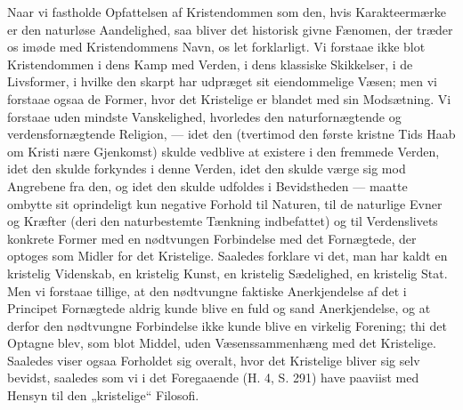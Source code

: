 \documentclass[12pt,a4paper,openany]{book}
\newcommand{\opage}[1]{\marginnote{\footnotesize\textit{[#1]}}}
\begin{document}
Naar vi fastholde Opfattelsen af Kristendommen som
den, hvis Karakteermærke er den naturløse Aandelighed, saa
bliver det historisk givne Fænomen, der træder os imøde
med Kristendommens Navn, os let forklarligt. Vi forstaae
ikke blot Kristendommen i dens Kamp med Verden, i dens
klassiske Skikkelser, i de Livsformer, i hvilke den skarpt har
udpræget sit eiendommelige Væsen; men vi forstaae ogsaa de
Former, hvor det Kristelige er blandet med sin Modsætning.
Vi forstaae uden mindste Vanskelighed, hvorledes den naturfornægtende
og verdensfornægtende Religion, --- idet den
(tvertimod den første kristne Tids Haab om Kristi nære
Gjenkomst) skulde vedblive at existere i den fremmede Verden,
idet den skulde forkyndes i denne Verden, idet den skulde
værge sig mod Angrebene fra den, og idet den skulde udfoldes
i Bevidstheden --- maatte ombytte sit oprindeligt kun
negative Forhold til Naturen, til de naturlige Evner og
Kræfter (deri den naturbestemte Tænkning indbefattet) og til
Verdenslivets konkrete Former med en nødtvungen Forbindelse
med det Fornægtede, der optoges som Midler for det
Kristelige. Saaledes forklare vi det, man har kaldt en
kristelig Videnskab, en kristelig Kunst, en kristelig Sædelighed,
en kristelig Stat. Men vi forstaae tillige, at den
nødtvungne faktiske Anerkjendelse af det i Principet Fornægtede
aldrig kunde blive en fuld og sand Anerkjendelse, og at
derfor den nødtvungne Forbindelse ikke kunde blive en virkelig
Forening; thi det Optagne blev, som blot Middel, uden
Væsenssammenhæng med det Kristelige. Saaledes viser ogsaa
\opage{454}Forholdet sig overalt, hvor det Kristelige bliver sig selv
bevidst, saaledes som vi i det Foregaaende (H. 4, S. 291)
have paaviist med Hensyn til den „kristelige“ Filosofi.
\end{document}
